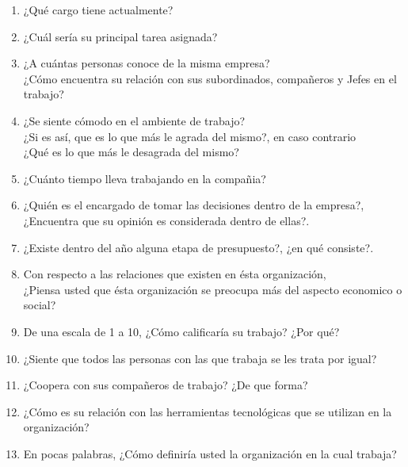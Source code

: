 \begin{enumerate}
	\item ¿Qué cargo tiene actualmente?
	\item ¿Cuál sería su principal tarea asignada?
	\item ¿A cuántas personas conoce de la misma empresa?\\
	      ¿Cómo encuentra su relación con sus subordinados, compañeros y Jefes en el trabajo?
	\item ¿Se siente cómodo en el ambiente de trabajo?\\
	      ¿Si es así, que es lo que más le agrada del mismo?, en caso contrario\\
	      ¿Qué es lo que más le desagrada del mismo?
	\item ¿Cuánto tiempo lleva trabajando en la compañia?
	\item ¿Quién es el encargado de tomar las decisiones dentro de la empresa?,\\ %
	      ¿Encuentra que su opinión es considerada dentro de ellas?. %
	\item ¿Existe dentro del año alguna etapa de presupuesto?, ¿en qué consiste?. %
	\item Con respecto a las relaciones que existen en ésta organización,\\
	      ¿Piensa usted que ésta organización se preocupa más del aspecto economico o social? %
	\item De una escala de 1 a 10, ¿Cómo calificaría su trabajo? ¿Por qué? %
	\item ¿Siente que todos las personas con las que trabaja se les trata por igual? %
	\item ¿Coopera con sus compañeros de trabajo? ¿De que forma? %
	\item ¿Cómo es su relación con las herramientas tecnológicas que se utilizan en la organización? %
	\item En pocas palabras, ¿Cómo definiría usted la organización en la cual trabaja?

\end{enumerate}
